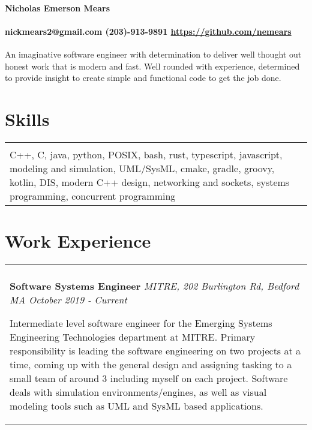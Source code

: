 \documentclass[10pt]{article}
\begin{document}
\paragraph{\centering \huge Nicholas Emerson Mears \\ }
\paragraph{\centering nickmears2@gmail.com (203)-913-9891 \url{https://github.com/nemears}\\}

An imaginative software engineer with determination to deliver well thought out honest work that is modern and fast. Well rounded with experience, determined to provide insight to create simple and functional code to get the job done.

\section*{Skills}
\begin{tabular}{p{18.5cm}}
  \hline
  \multicolumn{1}{c}{} \\
  C++, C, java, python, POSIX, bash, rust, typescript, javascript, modeling and simulation, UML/SysML, cmake, gradle, groovy, kotlin, 
  DIS, modern C++ design, networking and sockets, systems programming, concurrent programming
\end{tabular}

\section*{Work Experience}
\begin{tabular}{p{18.5cm}}
    \hline
    \multicolumn{1}{c}{} \\
    \large \textbf{Software Systems Engineer} \normalsize \textit{MITRE, 202 Burlington Rd, Bedford MA \hfill October 2019 - Current}

    \> Intermediate level software engineer for the Emerging Systems Engineering Technologies department at MITRE. Primary responsibility 
    is leading the software engineering on two projects at a time, coming up with the general design and assigning tasking to a small team
    of around 3 including myself on each project. Software deals with simulation environments/engines, as well as visual modeling tools such as 
    UML and SysML based applications.


\end{tabular}
\end{document}
